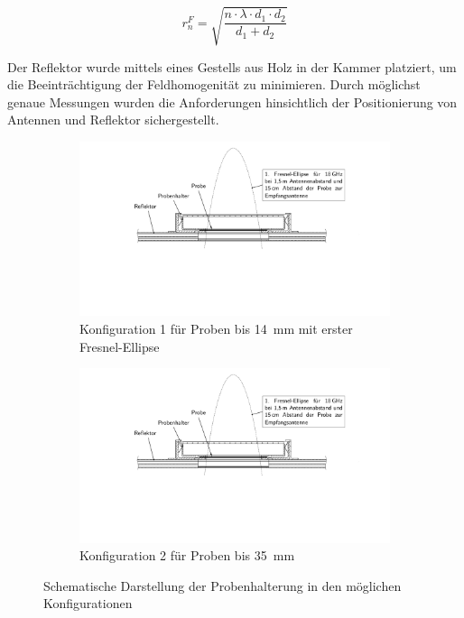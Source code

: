 \begin{equation}
    r^F_n = \sqrt{\frac{n\cdot \lambda\cdot d_1 \cdot d_2}{d_1 + d_2}}
    \label{Fresnelzone}
\end{equation}

\par
\vspace{\linespace}
Der Reflektor wurde mittels eines Gestells aus Holz in der Kammer platziert, um die Beeinträchtigung der Feldhomogenität zu minimieren. Durch möglichst genaue Messungen wurden die Anforderungen hinsichtlich der Positionierung von Antennen und Reflektor sichergestellt.
\par
\vspace{\linespace}

\begin{figure}[ht]
    \centering
    \begin{subfigure}[b]{0.9\textwidth}
        \includegraphics[page = 1, width=\textwidth, trim = 4.3cm 7cm 4.8cm 0cm, clip]{Abbildungen/Kapitel3/Probenhalter.pdf}
        \caption{Konfiguration 1 für Proben bis \SI{14}{\milli\meter} mit erster Fresnel-Ellipse}\label{subfig:3_Probenhalter_Konfig1}
    \end{subfigure}
    \hspace{2cm}
    \begin{subfigure}[b]{0.85\textwidth}
        \includegraphics[page = 2, width=\textwidth, trim = 5cm 7cm 5.5cm 7cm, clip]{Abbildungen/Kapitel3/Probenhalter.pdf}
        \caption{Konfiguration 2 für Proben bis \SI{35}{\milli\meter}}\label{subfig:3_Probenhalter_Konfig2}
    \end{subfigure}
    \caption{Schematische Darstellung der Probenhalterung in den möglichen Konfigurationen}
    \label{fig:3_Probenhalterung_und_Reflektor}
\end{figure}
    
